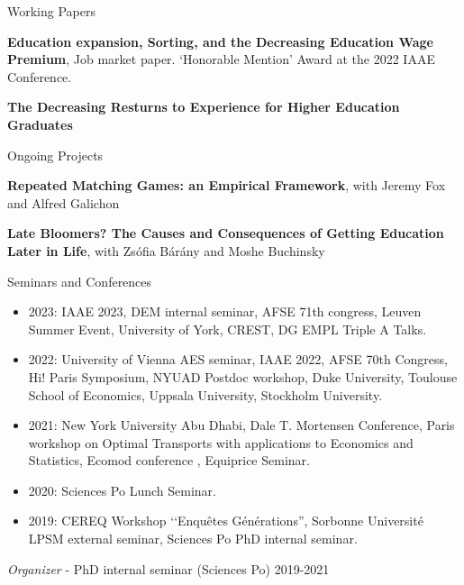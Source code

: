 \documentclass{resume} %
\begin{document}
\begin{rSection}{Working Papers}

  {\bf Education expansion, Sorting, and the Decreasing Education Wage Premium}, Job market paper. ‘Honorable Mention' Award at the 2022 IAAE Conference.
  
  {\bf The Decreasing Resturns to Experience for Higher Education Graduates}
  
  \end{rSection}

\begin{rSection}{Ongoing Projects}

{\bf Repeated Matching Games: an Empirical Framework}, with Jeremy Fox and Alfred Galichon

{\bf Late Bloomers? The Causes and Consequences of Getting Education Later in Life}, with Zsófia Bárány and Moshe Buchinsky

\end{rSection}


\begin{rSection}{Seminars and Conferences}
\begin{itemize}
  \item 2023: IAAE 2023, DEM internal seminar, AFSE 71th congress, Leuven Summer Event, University of York, CREST, DG EMPL Triple A Talks.
  \item 2022: University of Vienna AES seminar, IAAE 2022, AFSE 70th Congress, Hi! Paris Symposium, NYUAD Postdoc workshop, Duke University, Toulouse School of Economics, Uppsala University, Stockholm University.
  \item 2021: New York University Abu Dhabi, Dale T. Mortensen Conference, Paris workshop on Optimal Transports with applications to Economics and Statistics, Ecomod conference , Equiprice Seminar.
  \item 2020: Sciences Po Lunch Seminar.
  \item 2019: CEREQ Workshop ‘‘Enquêtes Générations'', Sorbonne Université LPSM external seminar, Sciences Po PhD internal seminar.
\end{itemize}

{\em Organizer} - PhD internal seminar (Sciences Po) \hfill {2019-2021}

\end{rSection}
\end{document}
